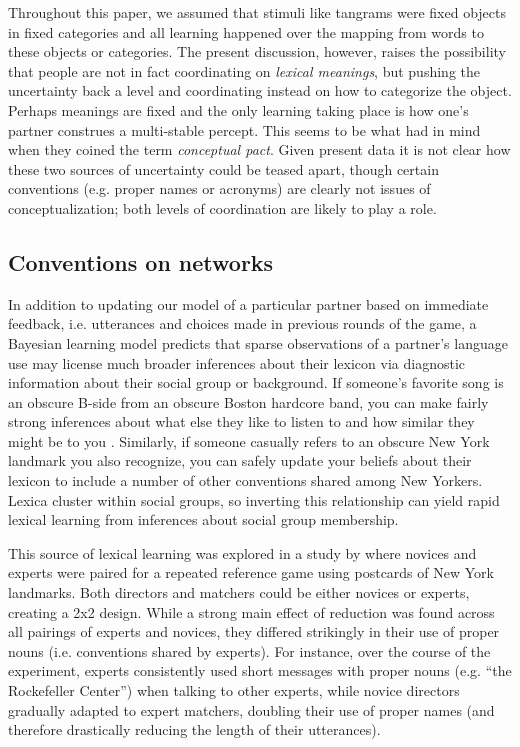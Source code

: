 Throughout this paper, we assumed that stimuli like tangrams were fixed objects in fixed categories and all learning happened over the mapping from words to these objects or categories. The present discussion, however, raises the possibility that people are not in fact coordinating on \emph{lexical meanings}, but pushing the uncertainty back a level and coordinating instead on how to categorize the object. Perhaps meanings are fixed and the only learning taking place is how one's partner construes a multi-stable percept. This seems to be what  had in mind when they coined the term \emph{conceptual pact}. Given present data it is not clear how these two sources of uncertainty could be teased apart, though certain conventions (e.g. proper names or acronyms) are clearly not issues of conceptualization; both levels of coordination are likely to play a role. 

\subsection{Conventions on networks}

In addition to updating our model of a particular partner based on immediate feedback, i.e. utterances and choices made in previous rounds of the game, a Bayesian learning model predicts that sparse observations of a partner's language use may license much broader inferences about their lexicon via diagnostic information about their social group or background. If someone's favorite song is an obscure B-side from an obscure Boston hardcore band, you can make fairly strong inferences about what else they like to listen to and how similar they might be to you \cite{VelezEtAl16_Overlaps, GershmanEtAl17_StructureSocialInfluence}. Similarly, if someone casually refers to an obscure New York landmark you also recognize, you can safely update your beliefs about their lexicon to include a number of other conventions shared among New Yorkers. Lexica cluster within social groups, so inverting this relationship can yield rapid lexical learning from inferences about social group membership.

This source of lexical learning was explored in a study by  where novices and experts were paired for a repeated reference game using postcards of New York landmarks. Both directors and matchers could be either novices or experts, creating a 2x2 design. While a strong main effect of reduction was found across all pairings of experts and novices, they differed strikingly in their use of proper nouns (i.e. conventions shared by experts). For instance, over the course of the experiment, experts consistently used short messages with proper nouns (e.g. ``the Rockefeller Center'') when talking to other experts, while novice directors gradually adapted to expert matchers, doubling their use of proper names (and therefore drastically reducing the length of their utterances).

